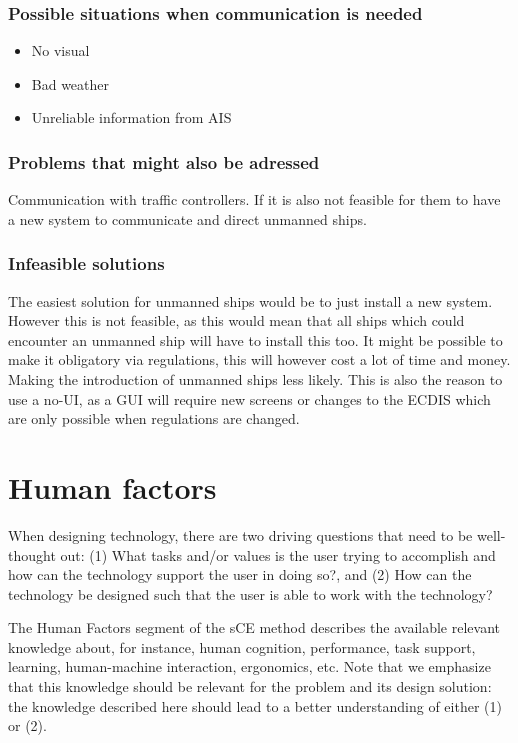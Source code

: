 \subsubsection{Possible situations when communication is needed}
\begin{itemize}
	\item No visual
	\item Bad weather
	\item Unreliable information from AIS
\end{itemize}

\subsubsection{Problems that might also be adressed}
Communication with traffic controllers. If it is also not feasible for them to have a new system to communicate and direct unmanned ships.

\subsubsection{Infeasible solutions}
The easiest solution for unmanned ships would be to just install a new system. However this is not feasible, as this would mean that all ships which could encounter an unmanned ship will have to install this too. It might be possible to make it obligatory via regulations, this will however cost a lot of time and money. Making the introduction of unmanned ships less likely.
This is also the reason to use a \ac{no-UI}, as a GUI will require new screens or changes to the \ac{ECDIS} which are only possible when regulations are changed.

\section{Human factors}
When designing technology, there are two driving questions that need to be well-thought out: (1) What tasks and/or values is the user trying to accomplish and how can the technology support the user in doing so?, and (2) How can the technology be designed such that the user is able to work with the technology?

The Human Factors segment of the sCE method describes the available relevant knowledge about, for instance, human cognition, performance, task support, learning, human-machine interaction, ergonomics, etc. Note that we emphasize that this knowledge should be relevant for the problem and its design solution: the knowledge described here should lead to a better understanding of either (1) or (2).

